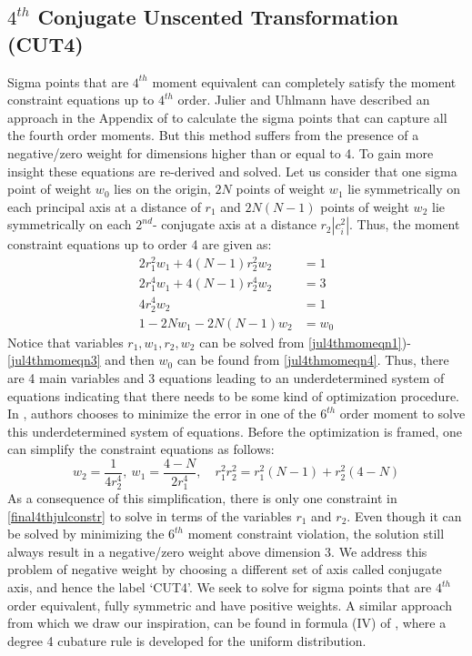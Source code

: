 \documentclass[letterpaper, 10 pt, conference]{IEEEtran}  %
\begin{document}
\subsection{$4^{th}$ Conjugate Unscented Transformation (CUT4)}
Sigma points that are $4^{th}$ moment equivalent can completely satisfy the moment constraint equations up to $4^{th}$ order. Julier and Uhlmann have described an approach in the Appendix of \cite{jul2} to calculate the sigma points that can capture all the fourth order moments. But this method suffers from the presence of a negative/zero weight for dimensions higher than or equal to 4. To gain more insight these equations are re-derived and solved. Let us consider that one sigma point of weight $w_0$ lies on the origin, $2N$ points of weight $w_1$ lie symmetrically on each principal axis at a distance of $r_1$ and $2N(N-1)$ points of weight $w_2$ lie symmetrically on each $2^{nd}$- conjugate axis at a distance $r_2|c^2_i|$. Thus, the moment constraint equations up to order 4 are given as:
\begin{align}
2r_1^2w_1+4(N-1)r_2^2w_2&=1 \label{jul4thmomeqn1}\\
2r_1^4w_1+4(N-1)r_2^4w_2&=3\label{jul4thmomeqn2}\\
4r_2^4w_2&=1\label{jul4thmomeqn3}\\
1-2Nw_1-2N(N-1)w_2&=w_0\label{jul4thmomeqn4}
\end{align}
Notice that variables $r_1,w_1,r_2,w_2$ can be solved from \eqref{jul4thmomeqn1})-\eqref{jul4thmomeqn3} and then $w_0$ can be found from \eqref{jul4thmomeqn4}. Thus, there are 4 main variables and 3 equations leading to an underdetermined system of equations indicating that there needs to be some kind of optimization procedure. In \cite{jul2}, authors chooses to minimize the error in one of the $6^{th}$ order moment to solve this underdetermined system of equations. Before the optimization is framed, one can simplify the constraint equations as follows:
\begin{equation}
w_2=\frac{1}{4r_2^4},\: w_1=\frac{4-N}{2r_1^4},\quad r_1^2r_2^2=r_1^2(N-1)+r_2^2(4-N) \label{final4thjulconstr}
\end{equation}
As a consequence of this simplification, there is only one constraint in \eqref{final4thjulconstr} to solve in terms of the variables $r_1$ and $r_2$. Even though it can be solved by minimizing the $6^{th}$ moment constraint violation, the solution still always result in a negative/zero weight above dimension 3. We address this problem of negative weight by choosing a different set of axis called conjugate axis, and hence the label `CUT4'. We seek to solve for sigma points that are $4^{th}$ order equivalent, fully symmetric and have positive weights.  A similar approach from which we draw our inspiration, can be found in formula (IV) of \cite{str5d}, where a degree 4 cubature rule is developed for the uniform distribution. 
\end{document}
